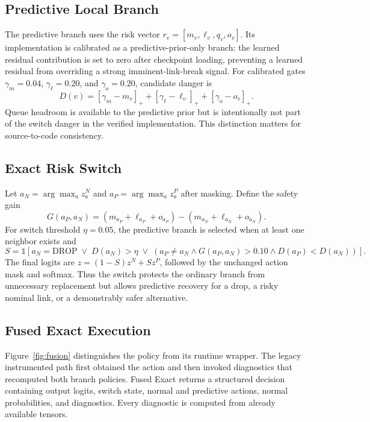 \documentclass[drones,article,submit,moreauthors]{Definitions/mdpi}
\newcommand{\drop}{\mathrm{DROP}}
\begin{document}
\subsection{Predictive Local Branch}

The predictive branch uses the risk vector $r_v=[m_v,\ell_v,q_v,o_v]$. Its implementation is calibrated as a predictive-prior-only branch: the learned residual contribution is set to zero after checkpoint loading, preventing a learned residual from overriding a strong imminent-link-break signal. For calibrated gates $\gamma_m=0.04$, $\gamma_\ell=0.20$, and $\gamma_o=0.20$, candidate danger is
\begin{equation}
D(v)=[\gamma_m-m_v]_+ + [\gamma_\ell-\ell_v]_+ + [\gamma_o-o_v]_+.
\label{eq:danger}
\end{equation}
Queue headroom is available to the predictive prior but is intentionally not part of the switch danger in the verified implementation. This distinction matters for source-to-code consistency.

\subsection{Exact Risk Switch}

Let $a_N=\arg\max_a z^N_a$ and $a_P=\arg\max_a z^P_a$ after masking. Define the safety gain
\begin{equation}
G(a_P,a_N)=(m_{a_P}+\ell_{a_P}+o_{a_P})-(m_{a_N}+\ell_{a_N}+o_{a_N}).
\end{equation}
For switch threshold $\eta=0.05$, the predictive branch is selected when at least one neighbor exists and
\begin{equation}
S=\mathbb{1}\left[a_N=\drop\;\lor\;D(a_N)>\eta\;\lor\;\left(a_P\neq a_N\land G(a_P,a_N)>0.10\land D(a_P)<D(a_N)\right)\right].
\label{eq:switch}
\end{equation}
The final logits are $z=(1-S)z^N+Sz^P$, followed by the unchanged action mask and softmax. Thus the switch protects the ordinary branch from unnecessary replacement but allows predictive recovery for a drop, a risky nominal link, or a demonstrably safer alternative.

\subsection{Fused Exact Execution}

Figure~\ref{fig:fusion} distinguishes the policy from its runtime wrapper. The legacy instrumented path first obtained the action and then invoked diagnostics that recomputed both branch policies. Fused Exact returns a structured decision containing output logits, switch state, normal and predictive actions, normal probabilities, and diagnostics. Every diagnostic is computed from already available tensors.
\end{document}
